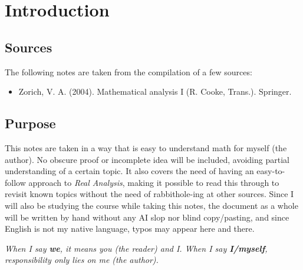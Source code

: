\section{Introduction}
\subsection{Sources}

The following notes are taken from the compilation of a few sources:
\begin{itemize}
	\item Zorich, V. A. (2004). Mathematical analysis I (R. Cooke, Trans.). Springer.
\end{itemize}

\subsection{Purpose}

This notes are taken in a way that is easy to understand math for myself (the author). No obscure proof or incomplete idea will be included, avoiding partial understanding of a certain topic. It also covers the need of having an easy-to-follow approach to \textit{Real Analysis}, making it possible to read this through to revisit known topics without the need of rabbithole-ing at other sources. Since I will also be studying the course while taking this notes, the document as a whole will be written by hand without any AI slop nor blind copy/pasting, and since English is not my native language, typos may appear here and there.

\vspace{2cm}

\textit{When I say \textbf{we}, it means you (the reader) and I. When I say \textbf{I/myself}, responsibility only lies on me (the author).}
\newpage
